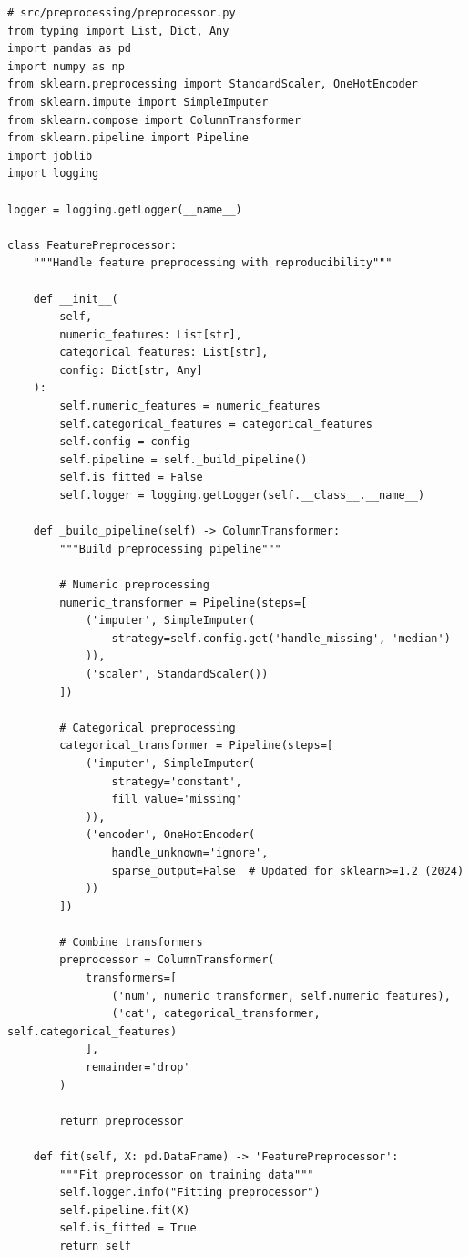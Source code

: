 \begin{lstlisting}[style=python, caption=Production ML Pipeline - Preprocessing Module]
# src/preprocessing/preprocessor.py
from typing import List, Dict, Any
import pandas as pd
import numpy as np
from sklearn.preprocessing import StandardScaler, OneHotEncoder
from sklearn.impute import SimpleImputer
from sklearn.compose import ColumnTransformer
from sklearn.pipeline import Pipeline
import joblib
import logging

logger = logging.getLogger(__name__)

class FeaturePreprocessor:
    """Handle feature preprocessing with reproducibility"""

    def __init__(
        self,
        numeric_features: List[str],
        categorical_features: List[str],
        config: Dict[str, Any]
    ):
        self.numeric_features = numeric_features
        self.categorical_features = categorical_features
        self.config = config
        self.pipeline = self._build_pipeline()
        self.is_fitted = False
        self.logger = logging.getLogger(self.__class__.__name__)

    def _build_pipeline(self) -> ColumnTransformer:
        """Build preprocessing pipeline"""

        # Numeric preprocessing
        numeric_transformer = Pipeline(steps=[
            ('imputer', SimpleImputer(
                strategy=self.config.get('handle_missing', 'median')
            )),
            ('scaler', StandardScaler())
        ])

        # Categorical preprocessing
        categorical_transformer = Pipeline(steps=[
            ('imputer', SimpleImputer(
                strategy='constant',
                fill_value='missing'
            )),
            ('encoder', OneHotEncoder(
                handle_unknown='ignore',
                sparse_output=False  # Updated for sklearn>=1.2 (2024)
            ))
        ])

        # Combine transformers
        preprocessor = ColumnTransformer(
            transformers=[
                ('num', numeric_transformer, self.numeric_features),
                ('cat', categorical_transformer, self.categorical_features)
            ],
            remainder='drop'
        )

        return preprocessor

    def fit(self, X: pd.DataFrame) -> 'FeaturePreprocessor':
        """Fit preprocessor on training data"""
        self.logger.info("Fitting preprocessor")
        self.pipeline.fit(X)
        self.is_fitted = True
        return self


\end{lstlisting}
